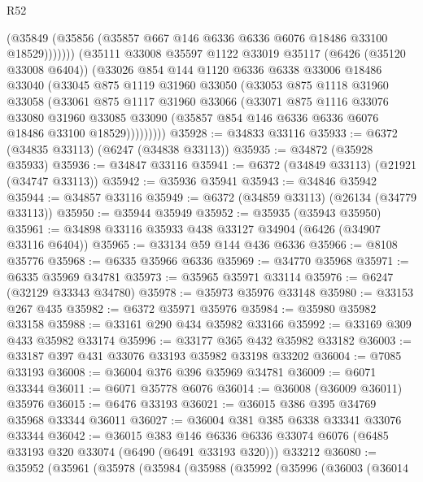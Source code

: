 \begin{lexlean}{R52}
\begin{coremodule}
                (@35849 (@35856 (@35857 @667 @146 @6336 @6336 @6076 @18486 @33100 @18529)))))))
        (@35111
          @33008
          @35597
          @1122
          @33019
          @35117
          (@6426 (@35120 @33008 @6404))
          (@33026
            @854
            @144
            @1120
            @6336
            @6338
            @33006
            @18486
            @33040
            (@33045
              @875
              @1119
              @31960
              @33050
              (@33053
                @875
                @1118
                @31960
                @33058
                (@33061
                  @875
                  @1117
                  @31960
                  @33066
                  (@33071
                    @875
                    @1116
                    @33076
                    @33080
                    @31960
                    @33085
                    @33090
                    (@35857 @854 @146 @6336 @6336 @6076 @18486 @33100 @18529)))))))))
@35928 := @34833 @33116
@35933 := @6372 (@34835 @33113) (@6247 (@34838 @33113))
@35935 := @34872 (@35928 @35933)
@35936 := @34847 @33116
@35941 := @6372 (@34849 @33113) (@21921 (@34747 @33113))
@35942 := @35936 @35941
@35943 := @34846 @35942
@35944 := @34857 @33116
@35949 := @6372 (@34859 @33113) (@26134 (@34779 @33113))
@35950 := @35944 @35949
@35952 := @35935 (@35943 @35950)
@35961 := @34898 @33116 @35933 @438 @33127 @34904 (@6426 (@34907 @33116 @6404))
@35965 := @33134 @59 @144 @436 @6336
@35966 := @8108 @35776
@35968 := @6335 @35966 @6336
@35969 := @34770 @35968
@35971 := @6335 @35969 @34781
@35973 := @35965 @35971 @33114
@35976 := @6247 (@32129 @33343 @34780)
@35978 := @35973 @35976 @33148
@35980 := @33153 @267 @435
@35982 := @6372 @35971 @35976
@35984 := @35980 @35982 @33158
@35988 := @33161 @290 @434 @35982 @33166
@35992 := @33169 @309 @433 @35982 @33174
@35996 := @33177 @365 @432 @35982 @33182
@36003 := @33187 @397 @431 @33076 @33193 @35982 @33198 @33202
@36004 := @7085 @33193
@36008 := @36004 @376 @396 @35969 @34781
@36009 := @6071 @33344
@36011 := @6071 @35778 @6076
@36014 := @36008 (@36009 @36011) @35976
@36015 := @6476 @33193
@36021 := @36015 @386 @395 @34769 @35968 @33344 @36011
@36027 := @36004 @381 @385 @6338 @33341 @33076 @33344
@36042 := @36015
    @383
    @146
    @6336
    @6336
    @33074
    @6076
    (@6485 @33193 @320 @33074 (@6490 (@6491 @33193 @320)))
    @33212
@36080 := @35952
    (@35961
      (@35978
        (@35984
          (@35988
            (@35992
              (@35996
                (@36003
                  (@36014

\end{coremodule}
\end{lexlean}
